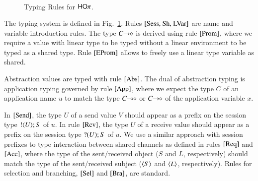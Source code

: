 \begin{figure}[t]
\[\begin{array}{lc}
%
%
	\end{array}
\]
\caption{Typing Rules for $\mathsf{HO}\pi$.\label{fig:typerulesmy}}
\Hline
\end{figure}
The typing system is defined in Fig.~\ref{fig:typerulesmy}.
Rules $\trule{Sess, Sh, LVar}$ are name and variable introduction rules. 
The type $C\!\! \rightarrow\!\! \diamond$ %
is derived using rule $\trule{Prom}$, where we require
a value with linear type to be typed without a linear
environment to be typed as a shared type.
Rule $\trule{EProm}$ allows to freely use a linear
type variable as shared.

Abstraction values are typed with rule $\trule{Abs}$.
The dual of abstraction typing is application typing
governed by rule $\trule{App}$, where we expect
the type $C$ of an application name $u$ 
to match the type $C\!\! \multimap\!\! \diamond$ or $C\!\! \rightarrow\!\! \diamond$
of the application variable $x$.

In $\trule{Send}$, 
the type $U$ of a send value $V$ should appear as a prefix
on the session type $! \langle U \rangle ; S$ of $u$.
In rule $\trule{Rcv}$, 
the type $U$ of a receive value should 
appear as a prefix on the session type $? (U) ; S$ of $u$.
We use a similar approach with session prefixes
to type interaction between shared channels as defined 
in rules $\trule{Req}$ and $\trule{Acc}$,
where the type of the sent/received object 
($S$ and $L$, respectively) should
match the type of the sent/received subject
($\langle S \rangle$ and $\langle L \rangle$, respectively).
Rules for selection and branching, 
$\trule{Sel}$ and $\trule{Bra}$, are standard. 

